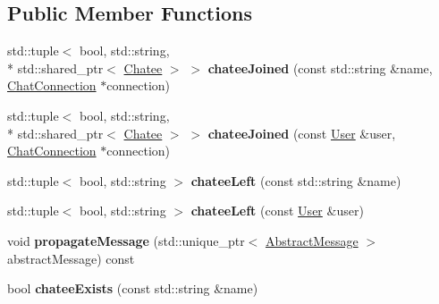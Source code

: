 \subsection*{Public Member Functions}
\begin{DoxyCompactItemize}
\item 
\hypertarget{classSimpleChat_1_1Chatroom_abc9ca0382abb99ffd24860e8e32b5e3e}{std\-::tuple$<$ bool, std\-::string, \\*
std\-::shared\-\_\-ptr$<$ \hyperlink{classSimpleChat_1_1Chatee}{Chatee} $>$ $>$ {\bfseries chatee\-Joined} (const std\-::string \&name, \hyperlink{classSimpleChat_1_1ChatConnection}{Chat\-Connection} $\ast$connection)}\label{classSimpleChat_1_1Chatroom_abc9ca0382abb99ffd24860e8e32b5e3e}

\item 
\hypertarget{classSimpleChat_1_1Chatroom_a99f4d75b62c04d28f8da815a8fff46e0}{std\-::tuple$<$ bool, std\-::string, \\*
std\-::shared\-\_\-ptr$<$ \hyperlink{classSimpleChat_1_1Chatee}{Chatee} $>$ $>$ {\bfseries chatee\-Joined} (const \hyperlink{classSimpleChat_1_1User}{User} \&user, \hyperlink{classSimpleChat_1_1ChatConnection}{Chat\-Connection} $\ast$connection)}\label{classSimpleChat_1_1Chatroom_a99f4d75b62c04d28f8da815a8fff46e0}

\item 
\hypertarget{classSimpleChat_1_1Chatroom_a279a6c40a420063585609ebf6ed798e9}{std\-::tuple$<$ bool, std\-::string $>$ {\bfseries chatee\-Left} (const std\-::string \&name)}\label{classSimpleChat_1_1Chatroom_a279a6c40a420063585609ebf6ed798e9}

\item 
\hypertarget{classSimpleChat_1_1Chatroom_a79f00ddf84c6036bf4d327b1c2a552fa}{std\-::tuple$<$ bool, std\-::string $>$ {\bfseries chatee\-Left} (const \hyperlink{classSimpleChat_1_1User}{User} \&user)}\label{classSimpleChat_1_1Chatroom_a79f00ddf84c6036bf4d327b1c2a552fa}

\item 
\hypertarget{classSimpleChat_1_1Chatroom_a11d5b07b4e10b6e217b669756ecd936e}{void {\bfseries propagate\-Message} (std\-::unique\-\_\-ptr$<$ \hyperlink{classSimpleChat_1_1AbstractMessage}{Abstract\-Message} $>$ abstract\-Message) const }\label{classSimpleChat_1_1Chatroom_a11d5b07b4e10b6e217b669756ecd936e}

\item 
\hypertarget{classSimpleChat_1_1Chatroom_a78aae1327ee5cdc9010c707ca9f231c7}{bool {\bfseries chatee\-Exists} (const std\-::string \&name)}\label{classSimpleChat_1_1Chatroom_a78aae1327ee5cdc9010c707ca9f231c7}


\end{DoxyCompactItemize}
